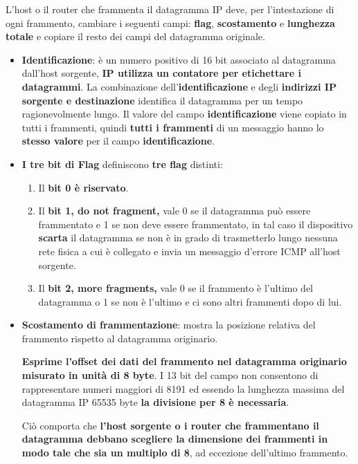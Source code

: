 \documentclass[11pt,a4paper,oneside]{book}
\theoremstyle{definition}
\begin{document}
L'host o il router che frammenta il datagramma IP deve, per l'intestazione di ogni frammento, cambiare i seguenti campi: \textbf{flag}, \textbf{scostamento} e \textbf{lunghezza totale} e copiare il resto dei campi del datagramma originale.
\begin{itemize}
	\item \textbf{Identificazione}: è un numero positivo di 16 bit associato al datagramma dall'host sorgente, \textbf{IP utilizza un contatore per etichettare i datagrammi}. La combinazione dell'\textbf{identificazione} e degli \textbf{indirizzi IP sorgente e destinazione} identifica il datagramma per un tempo ragionevolmente lungo. Il valore del campo \textbf{identificazione} viene copiato in tutti i frammenti, quindi \textbf{tutti i frammenti} di un messaggio hanno lo \textbf{stesso valore} per il campo \textbf{identificazione}.

	      \pagebreak

	\item \textbf {I tre bit di Flag} definiscono \textbf{tre flag} distinti:
	      \begin{enumerate}
		      \item Il \textbf{bit 0 è riservato}.

		      \item Il \textbf{bit 1, do not fragment,} vale 0 se il datagramma può essere frammentato e 1 se non deve essere frammentato, in tal caso il dispositivo \textbf{scarta} il datagramma se non è in grado di trasmetterlo lungo nessuna rete fisica a cui è collegato e invia un messaggio d'errore ICMP all'host sorgente.

		      \item Il \textbf{bit 2, more fragments,} vale 0 se il frammento è l'ultimo del datagramma o 1 se non è l'ultimo e ci sono altri frammenti dopo di lui.
	      \end{enumerate}

	\item \textbf{Scostamento di frammentazione}: mostra la posizione relativa del frammento rispetto al datagramma originario.

	      \textbf{Esprime l'offset dei dati del frammento nel datagramma originario misurato in unità di 8 byte}. I 13 bit del campo non consentono di rappresentare numeri maggiori di 8191 ed essendo la lunghezza massima del datagramma IP 65535 byte \textbf{la divisione per 8 è necessaria}.

	      Ciò comporta che \textbf{l'host sorgente o i router che frammentano il datagramma debbano scegliere la dimensione dei frammenti in modo tale che sia un multiplo di 8}, ad eccezione dell'ultimo frammento.


\end{itemize}
\end{document}

